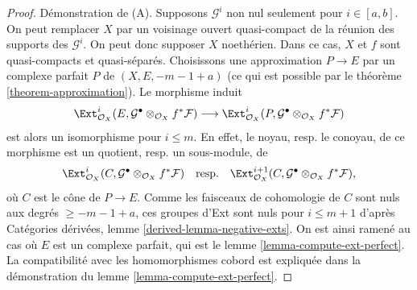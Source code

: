 \begin{proof}
D\'emonstration de (A). Supposons $\mathcal{G}^i$ non nul seulement pour
$i\in[a,b]$. On peut remplacer $X$ par un voisinage ouvert quasi-compact de la
r\'eunion des supports des $\mathcal{G}^i$. On peut donc supposer $X$
noeth\'erien. Dans ce cas, $X$ et $f$ sont quasi-compacts et quasi-s\'epar\'es.
Choisissons une approximation $P\to E$ par un complexe parfait $P$ de
$(X,E,-m-1+a)$ (ce qui est possible par le th\'eor\`eme
\ref{theorem-approximation}). Le morphisme induit
$$
\Ext^i_{\mathcal{O}_X}(E,
\mathcal{G}^\bullet \otimes_{\mathcal{O}_X} f^*\mathcal{F})
\longrightarrow
\Ext^i_{\mathcal{O}_X}(P,
\mathcal{G}^\bullet \otimes_{\mathcal{O}_X} f^*\mathcal{F})
$$
est alors un isomorphisme pour $i\leq m$. En effet, le noyau, resp. le
conoyau, de ce morphisme est un quotient, resp. un sous-module, de
$$
\Ext^i_{\mathcal{O}_X}(C,
\mathcal{G}^\bullet \otimes_{\mathcal{O}_X} f^*\mathcal{F})
\quad\text{resp.}\quad
\Ext^{i + 1}_{\mathcal{O}_X}(C,
\mathcal{G}^\bullet \otimes_{\mathcal{O}_X} f^*\mathcal{F}),
$$
o\`u $C$ est le c\^one de $P\to E$. Comme les faisceaux de cohomologie de $C$
sont nuls aux degr\'es $\geq-m-1+a$, ces groupes d'Ext sont nuls pour
$i\leq m+1$ d'apr\`es Cat\'egories d\'eriv\'ees, lemme
\ref{derived-lemma-negative-exts}. On est ainsi ramen\'e au cas o\`u $E$ est un
complexe parfait, qui est le lemme \ref{lemma-compute-ext-perfect}.
La compatibilit\'e avec les homomorphismes cobord est expliqu\'ee dans la
d\'emonstration du lemme \ref{lemma-compute-ext-perfect}.


\end{proof}
